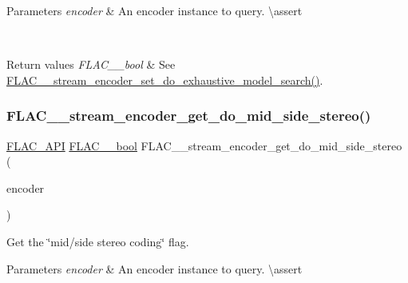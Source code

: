 \begin{DoxyParams}{Parameters}
{\em encoder} & An encoder instance to query. \textbackslash{}assert 
\begin{DoxyCode}{1}
\end{DoxyCode}
 \\
\hline
\end{DoxyParams}

\begin{DoxyRetVals}{Return values}
{\em F\+L\+A\+C\+\_\+\+\_\+bool} & See \mbox{\hyperlink{group__flac__stream__encoder_ga7fbc05ec9abd249a400fccb9f189e55e}{F\+L\+A\+C\+\_\+\+\_\+stream\+\_\+encoder\+\_\+set\+\_\+do\+\_\+exhaustive\+\_\+model\+\_\+search()}}. \\
\hline
\end{DoxyRetVals}
\mbox{\label{group__flac__stream__encoder_ga3308e73db9d0ae4803485c35d2a54a2d}} 
\subsubsection{\texorpdfstring{FLAC\_\_stream\_encoder\_get\_do\_mid\_side\_stereo()}{FLAC\_\_stream\_encoder\_get\_do\_mid\_side\_stereo()}}
{\footnotesize\ttfamily \mbox{\hyperlink{group__flac__export_ga56ca07df8a23310707732b1c0007d6f5}{F\+L\+A\+C\+\_\+\+A\+PI}} \mbox{\hyperlink{ordinals_8h_a95103469f1cbd78b8cf250194985b34e}{F\+L\+A\+C\+\_\+\+\_\+bool}} F\+L\+A\+C\+\_\+\+\_\+stream\+\_\+encoder\+\_\+get\+\_\+do\+\_\+mid\+\_\+side\+\_\+stereo (\begin{DoxyParamCaption}\item[{const \mbox{\hyperlink{struct_f_l_a_c_____stream_encoder}{F\+L\+A\+C\+\_\+\+\_\+\+Stream\+Encoder}} $\ast$}]{encoder }\end{DoxyParamCaption})}

Get the \char`\"{}mid/side stereo coding\char`\"{} flag.


\begin{DoxyParams}{Parameters}
{\em encoder} & An encoder instance to query. \textbackslash{}assert 
\begin{DoxyCode}{1}
\end{DoxyCode}
 \\
\hline
\end{DoxyParams}

